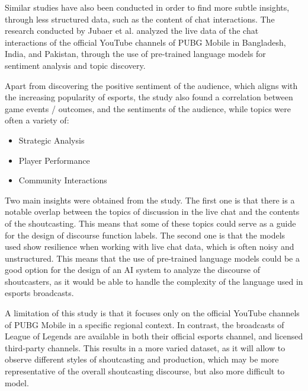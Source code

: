 \medskip

Similar studies have also been conducted in order to find more subtle insights, through less structured data, such as the content of chat interactions. The research conducted by Jubaer et al. \cite{jubaer2024analyzing} analyzed the live data of the chat interactions of the official YouTube channels of PUBG Mobile in Bangladesh, India, and Pakistan, through the use of pre-trained language models for sentiment analysis and topic discovery. 

\medskip

Apart from discovering the positive sentiment of the audience, which aligns with the increasing popularity of esports, the study also found a correlation between game events / outcomes, and the sentiments of the audience, while topics were often a variety of:

\begin{itemize}
  \item Strategic Analysis
  \item Player Performance
  \item Community Interactions
\end{itemize}

\medskip

Two main insights were obtained from the study. The first one is that there is a notable overlap between the topics of discussion in the live chat and the contents of the shoutcasting. This means that some of these topics could serve as a guide for the design of discourse function labels. The second one is that the models used show resilience when working with live chat data, which is often noisy and unstructured. This means that the use of pre-trained language models could be a good option for the design of an AI system to analyze the discourse of shoutcasters, as it would be able to handle the complexity of the language used in esports broadcasts.

\medskip

A limitation of this study is that it focuses only on the official YouTube channels of PUBG Mobile in a specific regional context. In contrast, the broadcasts of League of Legends are available in both their official esports channel, and licensed third-party channels. This results in a more varied dataset, as it will allow to observe different styles of shoutcasting and production, which may be more representative of the overall shoutcasting discourse, but also more difficult to model. 

\medskip

